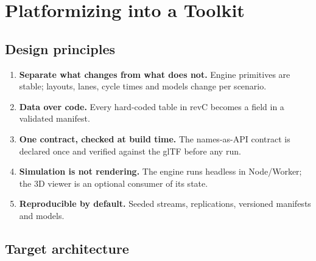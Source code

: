 \documentclass[11pt,a4paper]{article}
\begin{document}
\section{Platformizing into a Toolkit}
\label{sec:toolkit}

\subsection{Design principles}
\begin{enumerate}[leftmargin=*,itemsep=2pt]
  \item \textbf{Separate what changes from what does not.} Engine primitives are stable; layouts, lanes, cycle times and models change per scenario.
  \item \textbf{Data over code.} Every hard-coded table in revC becomes a field in a validated manifest.
  \item \textbf{One contract, checked at build time.} The names-as-API contract is declared once and verified against the glTF before any run.
  \item \textbf{Simulation is not rendering.} The engine runs headless in Node/Worker; the 3D viewer is an optional consumer of its state.
  \item \textbf{Reproducible by default.} Seeded streams, replications, versioned manifests and models.
\end{enumerate}

\subsection{Target architecture}
\end{document}
